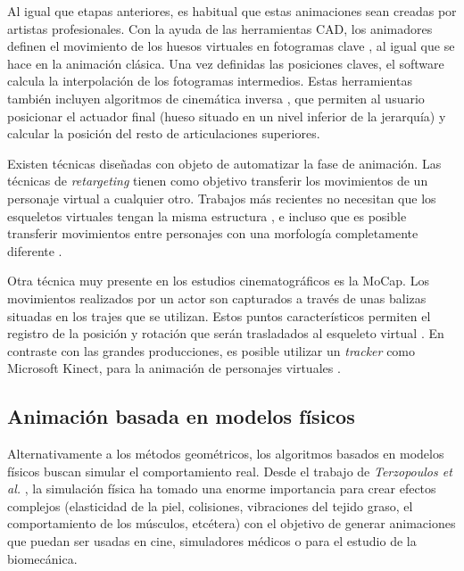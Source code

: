 Al igual que etapas anteriores, es habitual que estas animaciones sean creadas por artistas profesionales. Con la ayuda de las herramientas \ac{CAD}, los animadores definen el movimiento de los huesos virtuales en fotogramas clave \cite{keyframe}, al igual que se hace en la animación clásica. Una vez definidas las posiciones claves, el software calcula la interpolación de los fotogramas intermedios. Estas herramientas también incluyen algoritmos de cinemática inversa \cite{Shi:2007}, que permiten al usuario posicionar el actuador final (hueso situado en un nivel inferior de la jerarquía) y calcular la posición del resto de articulaciones superiores. 


Existen técnicas diseñadas con objeto de automatizar la fase de animación. Las técnicas de \emph{retargeting}\cite{Choi999} tienen como objetivo transferir los movimientos de un personaje virtual a cualquier otro. Trabajos más recientes no necesitan que los esqueletos virtuales tengan la misma estructura \cite{Hecker2008}, e incluso que es posible transferir movimientos entre personajes con una morfología completamente diferente \cite{Abdul2017}.


Otra técnica muy presente en los estudios cinematográficos es la \ac{MoCap}. Los movimientos realizados por un actor son capturados a través de unas balizas situadas en los trajes que se utilizan. Estos puntos característicos permiten el registro de la posición y rotación que serán trasladados al esqueleto virtual \cite{Menache:1999}. En contraste con las grandes producciones, es posible utilizar un \emph{\ac{tracker}} como Microsoft Kinect, para la animación de personajes virtuales \cite{Liu:2018}.




\subsection{Animación basada en modelos físicos}
\label{art:fisica}

Alternativamente a los métodos geométricos, los algoritmos basados en modelos físicos buscan simular el comportamiento real. Desde el trabajo de \emph{Terzopoulos et al.} \cite{terzopoulos1987elastically}, la simulación física ha tomado una enorme importancia para crear  efectos complejos (elasticidad de la piel, colisiones, vibraciones del tejido graso, el comportamiento de los músculos, etcétera) con el objetivo de generar animaciones que puedan ser usadas en cine, simuladores médicos o para el estudio de la biomecánica. 

